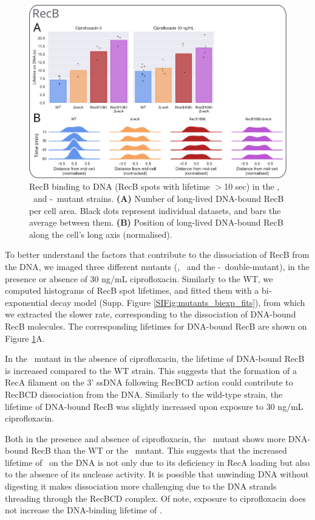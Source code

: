 \begin{figure}[htbp]
    \centering
    \includegraphics[width=.8\textwidth]{Figures/Fig5_mutants.pdf}
    \caption{RecB binding to DNA (RecB spots with lifetime $>$10 sec) in the \dreca, \teneighty\ and \dreca-\teneighty\ mutant strains. \textbf{(A)} Number of long-lived DNA-bound RecB per cell area. Black dots represent individual datasets, and bars the average between them. \textbf{(B)} Position of long-lived DNA-bound RecB along the cell's long axis (normalised).}
    \label{Fig:mutants}
\end{figure}

To better understand the factors that contribute to the dissociation of RecB from the DNA, we imaged three different mutants (\dreca, \teneighty\ and the \teneighty -\dreca\ double-mutant), in the presence or absence of 30 ng/mL ciprofloxacin. Similarly to the WT, we computed histograms of RecB spot lifetimes, and fitted them with a bi-exponential decay model (Supp. Figure \ref{SIFig:mutants_biexp_fits}), from which we extracted the slower rate, corresponding to the dissociation of DNA-bound RecB molecules. The corresponding lifetimes for DNA-bound RecB are shown on Figure \ref{Fig:mutants}A.

In the \dreca\ mutant in the absence of ciprofloxacin, the lifetime of DNA-bound RecB is increased compared to the WT strain. This suggests that the formation of a RecA filament on the 3' ssDNA following RecBCD action could contribute to RecBCD dissociation from the DNA. Similarly to the wild-type strain, the lifetime of DNA-bound RecB was slightly increased upon exposure to 30 ng/mL ciprofloxacin.

Both in the presence and absence of ciprofloxacin, the \teneighty\ mutant shows more DNA-bound RecB than the WT or the \dreca\ mutant. This suggests that the increased lifetime of \teneighty\ on the DNA is not only due to its deficiency in RecA loading but also to the absence of its nuclease activity. It is possible that unwinding DNA without digesting it makes dissociation more challenging due to the DNA strands threading through the RecBCD complex. Of note, exposure to ciprofloxacin does not increase the DNA-binding lifetime of \teneighty.

